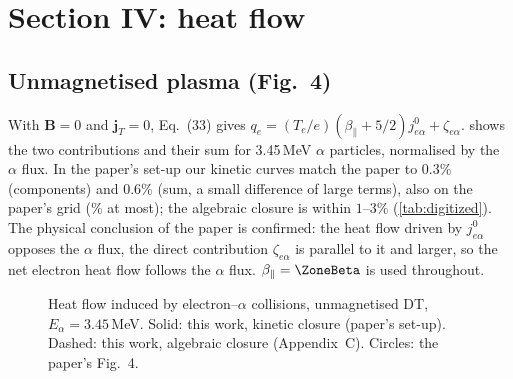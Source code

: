 \documentclass[11pt,a4paper]{article}
\newcommand{\R}{../results}
\newcommand{\D}{data}
\begin{document}
\section{Section IV: heat flow}\label{sec:iv}
\subsection{Unmagnetised plasma (Fig.~4)}
With $\mathbf B=0$ and $\mathbf j_T=0$, Eq.~(33) gives $q_e=(T_e/e)(\beta_\parallel+5/2)j^0_{e\alpha}+\zeta_{e\alpha}$.
 shows the two contributions and their sum for 3.45\,MeV $\alpha$ particles, normalised by the $\alpha$
flux. In the paper's set-up our kinetic curves match the paper to $0.3\%$ (components) and $0.6\%$ (sum, a small
difference of large terms), also on the paper's grid (\FigFourGridMax\% at most); the algebraic closure is within
$1$--$3\%$ (\cref{tab:digitized}). The physical conclusion of
the paper is confirmed: the heat flow driven by $j^0_{e\alpha}$ opposes the $\alpha$ flux, the direct contribution
$\zeta_{e\alpha}$ is parallel to it and larger, so the net electron heat flow follows the $\alpha$ flux.
$\beta_\parallel=\ZoneBeta$ is used throughout.

\begin{figure}[htb]\centering
{}
\caption{Heat flow induced by electron--$\alpha$ collisions, unmagnetised DT, $E_\alpha=3.45$\,MeV. Solid: this work,
kinetic closure (paper's set-up). Dashed: this work, algebraic closure (Appendix~C). Circles: the paper's Fig.~4.}
\label{fig:fig4}
\end{figure}
\end{document}
